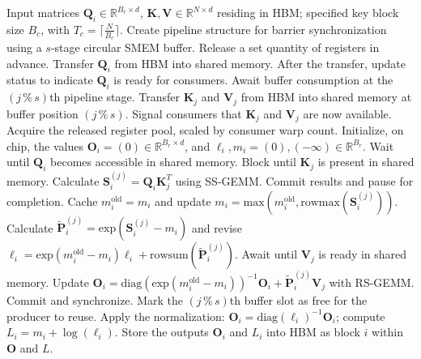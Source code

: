 \begin{algorithm}[H]
    \caption{\small\label{alg:flash3_wgmma_ws_only}\textsc{FlashAttention-3} forward pass \textbf{excluding} intra-consumer overlapping -- CTA perspective}
    \begin{algorithmic}[1]
\REQUIRE Input matrices $\mathbf{Q}_i \in \mathbb{R}^{B_r \times d}$, $\mathbf{K}, \mathbf{V} \in \mathbb{R}^{N \times d}$ residing in HBM; specified key block size $B_c$, with $T_c = \lceil \frac{N}{B_c} \rceil$.
\STATE Create pipeline structure for barrier synchronization using a $s$-stage circular SMEM buffer.
\STATE Release a set quantity of registers in advance.
\STATE Transfer $\mathbf{Q}_i$ from HBM into shared memory.
\STATE After the transfer, update status to indicate $\mathbf{Q}_i$ is ready for consumers.
    \STATE Await buffer consumption at the $(j\,\%\,s)$th pipeline stage.
    \STATE Transfer $\mathbf{K}_j$ and $\mathbf{V}_j$ from HBM into shared memory at buffer position $(j\,\%\,s)$.
    \STATE Signal consumers that $\mathbf{K}_j$ and $\mathbf{V}_j$ are now available.
\ENDFOR
\ELSE \STATE Acquire the released register pool, scaled by consumer warp count.
\STATE Initialize, on chip, the values $\mathbf{O}_i = (0) \in \mathbb{R}^{B_r \times d}$, and $\ell_i, m_i = (0), (-\infty) \in \mathbb{R}^{B_r}$.
\STATE Wait until $\mathbf{Q}_i$ becomes accessible in shared memory.
\STATE Block until $\mathbf{K}_j$ is present in shared memory.
\STATE Calculate $\mathbf{S}_i^{(j)} = \mathbf{Q}_i \mathbf{K}_j^T$ using SS-GEMM. Commit results and pause for completion. \label{alg:ws_only_gemm1}
\STATE Cache $m_i^{\mathrm{old}} = m_i$ and update $m_i = \mathrm{max}(m_i^{\mathrm{old}}, \mathrm{rowmax}(\mathbf{S}_i^{(j)}))$. \label{code-ws:softmax_start}
\STATE Calculate $\widetilde{\mathbf{P}}_i^{(j)} = \mathrm{exp}(\mathbf{S}_i^{(j)} - m_i)$ and revise $\ell_i = \mathrm{exp}(m_i^{\mathrm{old}} - m_i) \ell_i + \mathrm{rowsum}(\widetilde{\mathbf{P}}_i^{(j)})$. \label{code-ws:softmax_end}
\STATE Await until $\mathbf{V}_j$ is ready in shared memory.
\STATE Update $\mathbf{O}_i = \mathrm{diag}(\mathrm{exp}(m_i^{\mathrm{old}} - m_i))^{-1} \mathbf{O}_i + \widetilde{\mathbf{P}}_i^{(j)} \mathbf{V}_j$ with RS-GEMM. Commit and synchronize. \label{alg:ws_only_gemm2}
\STATE Mark the $(j\,\%\,s)$th buffer slot as free for the producer to reuse.
\ENDFOR
\STATE Apply the normalization: $\mathbf{O}_i = \mathrm{diag}(\ell_i)^{-1} \mathbf{O}_i$; compute $L_i = m_i + \log(\ell_i)$.
\STATE Store the outputs $\mathbf{O}_i$ and $L_i$ into HBM as block $i$ within $\mathbf{O}$ and $L$.
\ENDIF
\end{algorithmic}
\end{algorithm}

